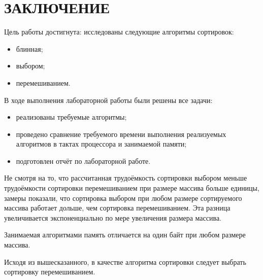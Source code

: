 \section*{ЗАКЛЮЧЕНИЕ}

Цель работы достигнута: исследованы следующие алгоритмы сортировок:
\begin{itemize}
	\item блинная;
	\item выбором;
	\item перемешиванием.
\end{itemize}

В ходе выполнения лабораторной работы были решены все задачи:
\begin{itemize}
	\item реализованы требуемые алгоритмы;
	\item проведено сравнение требуемого времени выполнения реализуемых алгоритмов в тактах процессора и занимаемой памяти;
	\item подготовлен отчёт по лабораторной работе.
\end{itemize}

Не смотря на то, что рассчитанная трудоёмкость сортировки выбором меньше трудоёмкости сортировки перемешиванием при размере массива больше единицы, замеры показали, что сортировка выбором при любом размере сортируемого массива работает дольше, чем сортировка перемешиванием.
Эта разница увеличивается экспоненциально по мере увеличения размера массива.

Занимаемая алгоритмами память отличается на один байт при любом размере массива.

Исходя из вышесказанного, в качестве алгоритма сортировки следует выбрать сортировку перемешиванием.